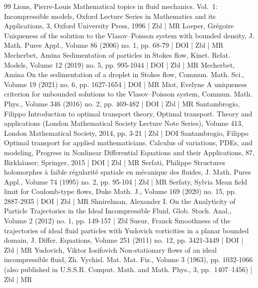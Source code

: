 \documentclass[10pt]{amsart}
\theoremstyle{definition}\newtheorem{defi}[theo]{Definition}\newtheorem{rema}[theo]{Remark}\newtheorem{exam}[theo]{Example}\newtheorem{exem}[theo]{Example}\newtheorem{nota}[theo]{Notation}
\begin{document}
\begin{thebibliography}{99}
 Lions, Pierre-Louis Mathematical topics in fluid mechanics. Vol. 1: Incompressible models, Oxford Lecture Series in Mathematics and its Applications, 3, Oxford University Press, 1996 | Zbl | MR
 Loeper, Grégoire Uniqueness of the solution to the Vlasov–Poisson system with bounded density, J. Math. Pures Appl., Volume 86 (2006) no. 1, pp. 68-79 | DOI | Zbl | MR
 Mecherbet, Amina Sedimentation of particles in Stokes flow, Kinet. Relat. Models, Volume 12 (2019) no. 5, pp. 995-1044 | DOI | Zbl | MR
 Mecherbet, Amina On the sedimentation of a droplet in Stokes flow, Commun. Math. Sci., Volume 19 (2021) no. 6, pp. 1627-1654 | DOI | MR
 Miot, Evelyne A uniqueness criterion for unbounded solutions to the Vlasov–Poisson system, Commun. Math. Phys., Volume 346 (2016) no. 2, pp. 469-482 | DOI | Zbl | MR
 Santambrogio, Filippo Introduction to optimal transport theory, Optimal transport. Theory and applications (London Mathematical Society Lecture Note Series), Volume 413, London Mathematical Society, 2014, pp. 3-21 | Zbl | DOI
 Santambrogio, Filippo Optimal transport for applied mathematicians. Calculus of variations, PDEs, and modeling, Progress in Nonlinear Differential Equations and their Applications, 87, Birkhäuser; Springer, 2015 | DOI | Zbl | MR
 Serfati, Philippe Structures holomorphes à faible régularité spatiale en mécanique des fluides, J. Math. Pures Appl., Volume 74 (1995) no. 2, pp. 95-104 | Zbl | MR
 Serfaty, Sylvia Mean field limit for Coulomb-type flows, Duke Math. J., Volume 169 (2020) no. 15, pp. 2887-2935 | DOI | Zbl | MR
 Shnirelman, Alexander I. On the Analyticity of Particle Trajectories in the Ideal Incompressible Fluid, Glob. Stoch. Anal., Volume 2 (2012) no. 1, pp. 149-157 | Zbl
 Sueur, Franck Smoothness of the trajectories of ideal fluid particles with Yudovich vorticities in a planar bounded domain, J. Differ. Equations, Volume 251 (2011) no. 12, pp. 3421-3449 | DOI | Zbl | MR
 Yudovich, Viktor Iosifovich Non-stationary flows of an ideal incompressible fluid, Zh. Vychisl. Mat. Mat. Fiz., Volume 3 (1963), pp. 1032-1066 (also published in U.S.S.R. Comput. Math. and Math. Phys., 3, pp. 1407–1456) | Zbl | MR
\end{thebibliography}
\end{document}
